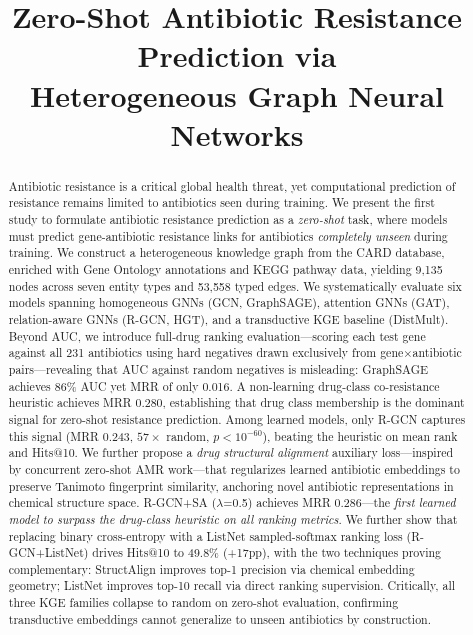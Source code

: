 \documentclass[conference]{IEEEtran}
\title{Zero-Shot Antibiotic Resistance Prediction via\\Heterogeneous Graph Neural Networks}
\author{
\IEEEauthorblockN{[Your Name]}
\IEEEauthorblockA{
Department of Computer Science\\
[Your University]\\
Email: [your-email]}
\and
\IEEEauthorblockN{[Professor Name]}
\IEEEauthorblockA{
Department of [Department]\\
[Your University]\\
Email: [prof-email]}
}
\begin{document}
\maketitle

\begin{abstract}
Antibiotic resistance is a critical global health threat, yet computational prediction of resistance remains limited to antibiotics seen during training. We present the first study to formulate antibiotic resistance prediction as a \textit{zero-shot} task, where models must predict gene-antibiotic resistance links for antibiotics \textit{completely unseen} during training. We construct a heterogeneous knowledge graph from the CARD database, enriched with Gene Ontology annotations and KEGG pathway data, yielding 9,135 nodes across seven entity types and 53,558 typed edges. We systematically evaluate six models spanning homogeneous GNNs (GCN, GraphSAGE), attention GNNs (GAT), relation-aware GNNs (R-GCN, HGT), and a transductive KGE baseline (DistMult). Beyond AUC, we introduce full-drug ranking evaluation---scoring each test gene against all 231 antibiotics using hard negatives drawn exclusively from gene$\times$antibiotic pairs---revealing that AUC against random negatives is misleading: GraphSAGE achieves 86\% AUC yet MRR of only 0.016. A non-learning drug-class co-resistance heuristic achieves MRR 0.280, establishing that drug class membership is the dominant signal for zero-shot resistance prediction. Among learned models, only R-GCN captures this signal (MRR 0.243, $57\times$ random, $p < 10^{-60}$), beating the heuristic on mean rank and Hits@10. We further propose a \textit{drug structural alignment} auxiliary loss---inspired by concurrent zero-shot AMR work---that regularizes learned antibiotic embeddings to preserve Tanimoto fingerprint similarity, anchoring novel antibiotic representations in chemical structure space. R-GCN+SA ($\lambda$=0.5) achieves MRR 0.286---the \textit{first learned model to surpass the drug-class heuristic on all ranking metrics}. We further show that replacing binary cross-entropy with a ListNet sampled-softmax ranking loss (R-GCN+ListNet) drives Hits@10 to 49.8\% (+17pp), with the two techniques proving complementary: StructAlign improves top-1 precision via chemical embedding geometry; ListNet improves top-10 recall via direct ranking supervision. Critically, all three KGE families collapse to random on zero-shot evaluation, confirming transductive embeddings cannot generalize to unseen antibiotics by construction.
\end{abstract}
\end{document}

